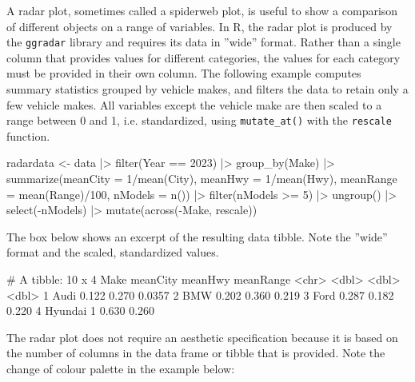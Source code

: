 \begin{withcode}


     



A radar plot, sometimes called a spiderweb plot, is useful to show a comparison of different objects on a range of variables. In R, the radar plot is produced by the \texttt{ggradar} library and requires its data in ''wide'' format. Rather than a single column that provides values for different categories, the values for each category must be provided in their own column. The following example computes summary statistics grouped by vehicle makes, and filters the data to retain only a few vehicle makes. All variables except the vehicle make are then scaled to a range between 0 and 1, i.e. standardized, using \texttt{mutate\_at()} with the \texttt{rescale} function.

\begin{Rcode}
radardata <- data |>
  filter(Year == 2023) |> group_by(Make) |>
  summarize(meanCity = 1/mean(City), 
            meanHwy = 1/mean(Hwy), 
            meanRange = mean(Range)/100, 
            nModels = n()) |>
  filter(nModels >= 5) |> ungroup() |>
  select(-nModels) |>
  mutate(across(-Make, rescale))
\end{Rcode}

The box below shows an excerpt of the resulting data tibble. Note the ''wide'' format and the scaled, standardized values. 

\begin{textcode}
# A tibble: 10 x 4
   Make          meanCity meanHwy meanRange
   <chr>            <dbl>   <dbl>     <dbl>
 1 Audi            0.122    0.270    0.0357
 2 BMW             0.202    0.360    0.219 
 3 Ford            0.287    0.182    0.220 
 4 Hyundai         1        0.630    0.260 
\end{textcode}

The radar plot does not require an aesthetic specification because it is based on the number of columns in the data frame or tibble that is provided. Note the change of colour palette in the example below:


\end{withcode}
